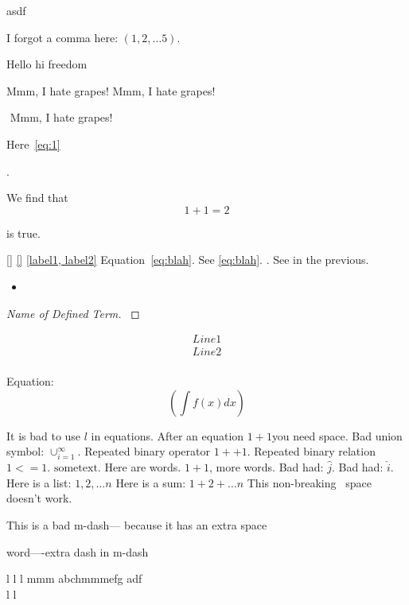 asdf

I forgot a comma here: $(1, 2, \dots 5)$.

\cite{} 









Hello hi freedom

Mmm, I hate grapes! 
Mmm, I hate grapes! 

$$ $$ $$ $$
$ $
Mmm, I hate grapes! 


Here~\cref{eq:1}

\[
    
\].

We find that
\[
    1 + 1 = 2
\] 

is true.
 
\ref{} 
\cref{}
\cite{}
\label{\alpha}
\label{a,b} 
\cref{label1, label2}
Equation~\ref{eq:blah}.
See \cref{eq:blah}.
\cite[Theorem 1]{a}. 
See in the previous.


\begin{itemize}
    a
    \item  
\end{itemize}

\begin{proof}[Name of Defined Term]
    \label{def:Name of Defined Term}
    

\end{proof}
\begin{align}
    Line 1 \\
    Line 2 \\
\end{align}

Equation:
\[
    (\int f(x) dx)
\] 


It is bad to use $l$ in equations.
After an equation $1+1$you need space.
Bad union symbol: $\cup_{i=1}^\infty$.
Repeated binary operator $1 ++ 1$.
Repeated binary relation $1 <= 1$.
$\mathrm{some text}$.
Here are words. $1 + 1$, more words.
Bad had: $\hat{j}$.
Bad had: $\hat i$.
Here is a list: $1, 2, \dots n$
Here is a sum: $1 + 2 + \dots n$
This non-breaking~ space doesn't work.

This is a bad m-dash---
because it has an extra space

word----extra dash in m-dash
  
 \hat{\jmath} l  l l    mmm abchmmmefg adf
 $$ $$  
 l  l

